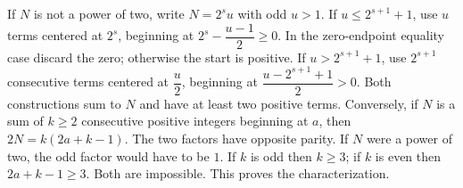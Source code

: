 If $N$ is not a power of two, write $N=2^su$ with odd $u>1$. If $u\le 2^{s+1}+1$, use $u$ terms centered at $2^s$, beginning at $2^s-\dfrac{u-1}{2}\ge 0$. In the zero-endpoint equality case discard the zero; otherwise the start is positive. If $u>2^{s+1}+1$, use $2^{s+1}$ consecutive terms centered at $\dfrac{u}{2}$, beginning at $\dfrac{u-2^{s+1}+1}{2}>0$. Both constructions sum to $N$ and have at least two positive terms. Conversely, if $N$ is a sum of $k\ge 2$ consecutive positive integers beginning at $a$, then $2N=k(2a+k-1)$. The two factors have opposite parity. If $N$ were a power of two, the odd factor would have to be $1$. If $k$ is odd then $k\ge 3$; if $k$ is even then $2a+k-1\ge 3$. Both are impossible. This proves the characterization.
